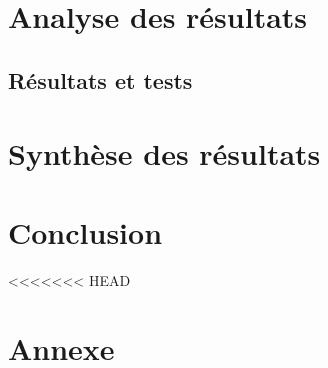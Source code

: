 \documentclass[11pt]{article}
\begin{document}
\subsubsection{} \label{Deep}

	
\subsubsection{}

\cleardoublepage


\section{Analyse des résultats}


\subsection{}

\subsection{Résultats et tests}

\cleardoublepage



\section{Synthèse des résultats}

\cleardoublepage


\section{Conclusion}
\cleardoublepage



<<<<<<< HEAD
\section{Annexe}


\cleardoublepage
\end{document}

